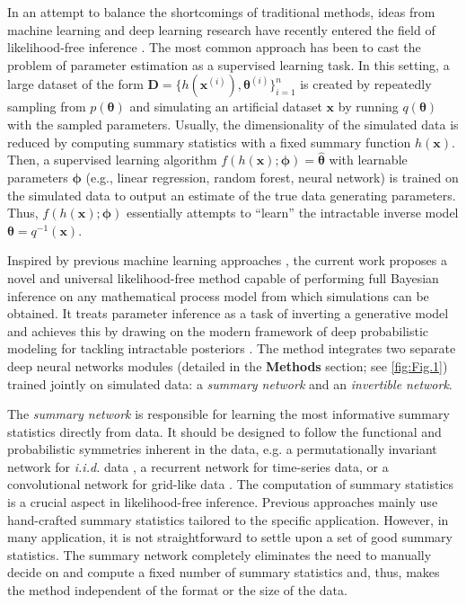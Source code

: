 \documentclass[9pt,twoside,lineno]{pnas-new}
\begin{document}
In an attempt to balance the shortcomings of traditional methods, ideas from machine learning and deep learning research have recently entered the field of likelihood-free inference \cite{mertens2019deep, radev2019towards, hwang2018conditional, mestdagh2018prepaid, raynal2018abc, jiang2017learning, lueckmann2017flexible, papamakarios2016fast}. The most common approach has been to cast the problem of parameter estimation as a supervised learning task. In this setting, a large dataset of the form $\boldsymbol{D} = \{h(\boldsymbol{x}^{(i)}), \boldsymbol{\theta}^{(i)}\}_{i=1}^{n}$ is created by repeatedly sampling from $p(\boldsymbol{\theta})$ and simulating an artificial dataset $\boldsymbol{x}$ by running $q(\boldsymbol{\theta})$ with the sampled parameters. Usually, the dimensionality of the simulated data is reduced by computing summary statistics  with a fixed summary function $h(\boldsymbol{x})$. Then, a supervised learning algorithm $f(h(\boldsymbol{x});\boldsymbol{\phi}) = \widehat{\boldsymbol{\theta}}$ with learnable parameters $\boldsymbol{\phi}$ (e.g., linear regression, random forest, neural network) is trained on the simulated data to output an estimate of the true data generating parameters. Thus, $f(h(\boldsymbol{x});\boldsymbol{\phi})$ essentially attempts to “learn” the intractable inverse model $\boldsymbol{\theta} = q^{-1}(\boldsymbol{x})$.

Inspired by previous machine learning approaches \cite{hwang2018conditional, mestdagh2018prepaid, raynal2018abc, jiang2017learning, lueckmann2017flexible, papamakarios2016fast}, the current work proposes a novel and universal likelihood-free method capable of performing full Bayesian inference on any mathematical process model from which simulations can be obtained. It treats parameter inference as a task of inverting a generative model and achieves this by drawing on the modern framework of deep probabilistic modeling for tackling intractable posteriors \cite{ardizzone2018analyzing, kingma2018glow, grover2018flow, dinh2016density}. The method integrates two separate deep neural networks modules (detailed in the \textbf{Methods} section; see \autoref{fig:Fig.1}) trained jointly on simulated data: a \textit{summary network} and an \textit{invertible network}. 

The \textit{summary network} is responsible for learning the most informative summary statistics directly from data. It should be designed to follow the functional and probabilistic symmetries inherent in the data, e.g. a permutationally invariant network for \textit{i.i.d.} data \cite{bloem2019probabilistic}, a recurrent network for time-series data, or a convolutional network for grid-like data \cite{goodfellow2016deep}. The computation of summary statistics is a crucial aspect in likelihood-free inference. Previous approaches mainly use hand-crafted summary statistics tailored to the specific application. However, in many application, it is not straightforward to settle upon a set of good summary statistics. The summary network completely eliminates the need to manually decide on and compute a fixed number of summary statistics and, thus, makes the method independent of the format or the size of the data.
\end{document}
